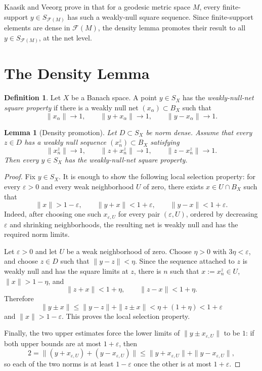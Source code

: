 \documentclass[11pt]{amsart}
\newtheorem{lemma}{Lemma}
\theoremstyle{definition}
\newtheorem{definition}{Definition}
\theoremstyle{remark}
\newcommand{\F}{\mathcal F}
\begin{document}
Kaasik and Veeorg prove in \cite{KaasikVeeorg2022} that for a geodesic metric
space \(M\), every finite-support \(y\in S_{\F(M)}\) has such a weakly-null
square sequence.  Since finite-support elements are dense in \(\F(M)\), the
density lemma promotes their result to all \(y\in S_{\F(M)}\), at the net
level.

\section{The Density Lemma}

\begin{definition}
Let \(X\) be a Banach space.  A point \(y\in S_X\) has the
\emph{weakly-null-net square property} if there is a weakly null net
\((x_\alpha)\subset B_X\) such that
\[
  \|x_\alpha\|\to 1,\qquad
  \|y+x_\alpha\|\to 1,\qquad
  \|y-x_\alpha\|\to 1 .
\]
\end{definition}

\begin{lemma}[Density promotion]
\label{lem:density}
Let \(D\subset S_X\) be norm dense.  Assume that every \(z\in D\) has a
weakly null sequence \((x_n^z)\subset B_X\) satisfying
\[
  \|x_n^z\|\to 1,\qquad
  \|z+x_n^z\|\to 1,\qquad
  \|z-x_n^z\|\to 1 .
\]
Then every \(y\in S_X\) has the weakly-null-net square property.
\end{lemma}

\begin{proof}
Fix \(y\in S_X\).  It is enough to show the following local selection
property: for every \(\varepsilon>0\) and every weak neighborhood \(U\) of
zero, there exists \(x\in U\cap B_X\) such that
\[
  \|x\|>1-\varepsilon,\qquad
  \|y+x\|<1+\varepsilon,\qquad
  \|y-x\|<1+\varepsilon .
\]
Indeed, after choosing one such \(x_{\varepsilon,U}\) for every pair
\((\varepsilon,U)\), ordered by decreasing \(\varepsilon\) and shrinking
neighborhoods, the resulting net is weakly null and has the required norm
limits.

Let \(\varepsilon>0\) and let \(U\) be a weak neighborhood of zero.  Choose
\(\eta>0\) with \(3\eta<\varepsilon\), and choose \(z\in D\) such that
\(\|y-z\|<\eta\).  Since the sequence attached to \(z\) is weakly null and
has the square limits at \(z\), there is \(n\) such that \(x:=x_n^z\in U\),
\(\|x\|>1-\eta\), and
\[
  \|z+x\|<1+\eta,\qquad
  \|z-x\|<1+\eta .
\]
Therefore
\[
  \|y\pm x\|\le \|y-z\|+\|z\pm x\| < \eta+(1+\eta)<1+\varepsilon
\]
and \(\|x\|>1-\varepsilon\).  This proves the local selection property.

Finally, the two upper estimates force the lower limits of
\(\|y\pm x_{\varepsilon,U}\|\) to be \(1\): if both upper bounds are at most
\(1+\varepsilon\), then
\[
  2=\|(y+x_{\varepsilon,U})+(y-x_{\varepsilon,U})\|
    \le \|y+x_{\varepsilon,U}\|+\|y-x_{\varepsilon,U}\|,
\]
so each of the two norms is at least \(1-\varepsilon\) once the other is at
most \(1+\varepsilon\).
\end{proof}
\end{document}
